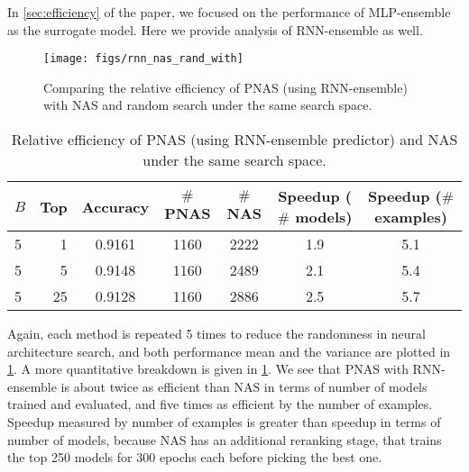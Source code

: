 \documentclass[runningheads]{llncs}
\begin{document}
In \cref{sec:efficiency} of the paper, we focused on the performance of MLP-ensemble as the surrogate model.
Here we provide analysis of RNN-ensemble as well.

\begin{figure}[h]
\centering
\texttt{[image: figs/rnn\_nas\_rand\_with]}
\caption{Comparing the relative efficiency of PNAS (using RNN-ensemble) with NAS and random search under the same search space.}
\label{fig:efficiency-appendix}
\end{figure}\begin{table}[H]
    \begin{center}
    \begin{tabular}{l|r|c|c|c|c|c}
    \toprule
    $B$ & Top & Accuracy & $\#$\;PNAS & $\#$\;NAS & Speedup ($\#$ models) & Speedup ($\#$ examples) \\ 
    \midrule
    5 & 1 & 0.9161 & 1160 & 2222 & 1.9 & 5.1 \\
    5 & 5 & 0.9148 & 1160 & 2489 & 2.1 & 5.4 \\
    5 & 25 & 0.9128 & 1160 & 2886 & 2.5 & 5.7 \\ 
    \bottomrule
    \end{tabular}
    \end{center}
    \caption{Relative efficiency of PNAS (using RNN-ensemble predictor) and NAS under the same search space.
    }
    \label{tab:speedup-appendix}
\end{table}

Again, each method is repeated 5 times to reduce the randomness in neural architecture search, and both performance mean and the variance are plotted in \cref{fig:efficiency-appendix}.
A more quantitative breakdown is given in \cref{tab:speedup-appendix}.
We see that PNAS with RNN-ensemble is about twice as efficient than NAS in terms of number of models trained and evaluated, and five times as efficient by the number of examples.
Speedup measured by number of examples is greater than speedup in terms of number of models, because NAS has an additional reranking stage, that trains the top 250 models for 300 epochs each before picking the best one.
\end{document}
